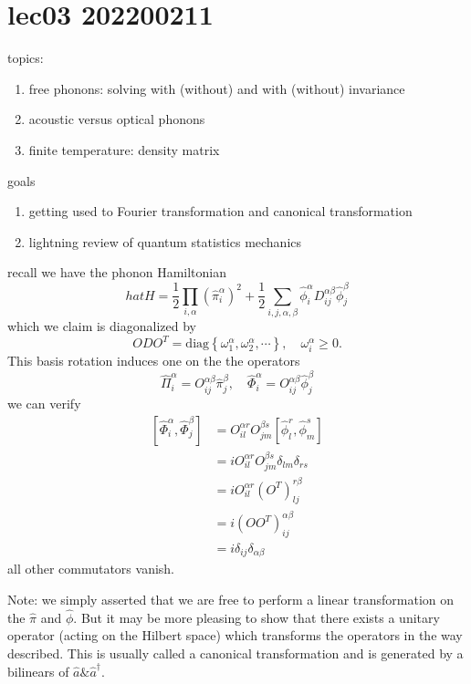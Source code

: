 \chapter{lec03 202200211}

topics:

\begin{enumerate}
    \item free phonons: solving with (without) and with (without) invariance
    \item acoustic versus optical phonons
    \item finite temperature: density matrix
\end{enumerate}

goals

\begin{enumerate}
    \item getting used to Fourier transformation and canonical transformation
    \item lightning review of quantum statistics mechanics
\end{enumerate}

recall we have the phonon Hamiltonian
\[ hat{H}=\frac{1}{2}\prod_{i,\alpha}{\left( \hat{\pi}_{i}^{\alpha} \right) ^2}+\frac{1}{2}\sum_{i,j,\alpha ,\beta}{\hat{\phi}_{i}^{\alpha}D_{ij}^{\alpha \beta}\hat{\phi}_{j}^{\beta}} \]
which we claim is diagonalized by
\[ ODO^T=\mathrm{diag}\left\{ \omega _{1}^{\alpha},\omega _{2}^{\alpha},\cdots \right\} ,\quad \omega _{i}^{\alpha}\ge 0.\]
This basis rotation induces one on the the operators
\[ \hat{\Pi}_{i}^{\alpha}=O_{ij}^{\alpha \beta}\hat{\pi}_{j}^{\beta},\quad \hat{\Phi}_{i}^{\alpha}=O_{ij}^{\alpha \beta}\hat{\phi}_{j}^{\beta}\]
we can verify
\begin{align*}
    \left[ \hat{\Phi}_{i}^{\alpha},\hat{\Phi}_{j}^{\beta} \right] &=O_{il}^{\alpha r}O_{jm}^{\beta s}\left[ \hat{\phi}_{l}^{r},\hat{\phi}_{m}^{s} \right] \\
    &=iO_{il}^{\alpha r}O_{jm}^{\beta s}\delta _{lm}\delta _{rs}\\
    &=iO_{il}^{\alpha r}\left( O^T \right) _{lj}^{r\beta}\\
    &=i\left( OO^T \right) _{ij}^{\alpha \beta}\\
    &=i\delta _{ij}\delta _{\alpha \beta}
\end{align*}
all other commutators vanish.

Note: we simply asserted that we are free to perform a linear transformation on the $\hat{\pi}$ and $\hat{\phi}$. But it may be more pleasing to show that there exists a unitary operator (acting on the Hilbert space) which transforms the operators in the way described. This is usually called a canonical transformation and is generated by a bilinears of $\hat{a} \& \hat{a}^\dagger$.

